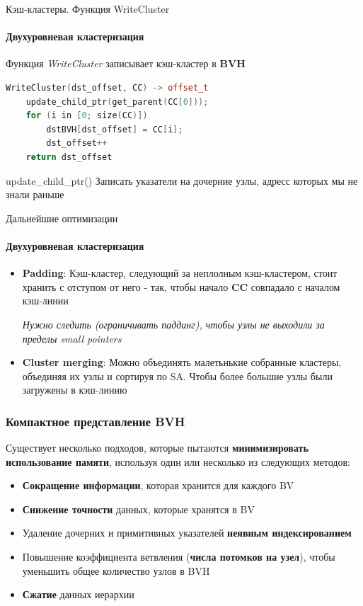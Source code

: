 \documentclass{beamer}
\begin{document}
\begin{frame}[fragile]{Кэш-кластеры. Функция WriteCluster}
    \framesubtitle{Двухуровневая кластеризация}
    \begin{block}{}
        Функция \textit{WriteCluster} записывает кэш-кластер в \textbf{BVH}
    \end{block}
    \begin{lstlisting}[language=C++,basicstyle=\ttfamily,keywordstyle=\color{blue}]
WriteCluster(dst_offset, CC) -> offset_t
    update_child_ptr(get_parent(CC[0]));
    for (i in [0; size(CC)])
        dstBVH[dst_offset] = CC[i];
        dst_offset++
    return dst_offset
    \end{lstlisting}
    \begin{block}{update\_child\_ptr()}
        Записать указатели на дочерние узлы, адресс которых мы не знали раньше
    \end{block}
\end{frame}

\begin{frame}[t]{Дальнейшие оптимизации}
    \framesubtitle{Двухуровневая кластеризация}
    \begin{itemize}
        \item
            \textbf{Padding}:
            Кэш-кластер, следующий за неплолным кэш-кластером, стоит хранить с отступом от него -
            так, чтобы начало \textbf{CC} совпадало с началом кэш-линии

            \textit{Нужно следить (ограничивать паддинг), чтобы узлы не выходили за пределы \textit{small pointers}}
        \item
            \textbf{Cluster merging}:
            Можно объединять малетьнькие собранные кластеры, объединяя их узлы и сортируя по SA.
            Чтобы более большие узлы были загружены в кэш-линию
    \end{itemize}
\end{frame}

\begin{frame}[t]
    \frametitle{Компактное представление BVH}
    Существует несколько подходов, которые пытаются \textbf{минимизировать использование памяти}, используя один или несколько из следующих методов:
    \begin{itemize}
        \item
            \textbf{Сокращение информации}, которая хранится для каждого BV
        \item
            \textbf{Снижение точности} данных, которые хранятся в BV
        \item
            Удаление дочерних и примитивных указателей \textbf{неявным индексированием}
        \item
            Повышение коэффициента ветвления (\textbf{числа потомков на узел}), чтобы уменьшить общее количество узлов в BVH
        \item
            \textbf{Сжатие} данных иерархии
    \end{itemize}
\end{frame}
\end{document}
